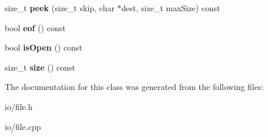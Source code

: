 \begin{DoxyCompactItemize}
\item 
\hypertarget{class_tempest_1_1_r_file_a64ee2bbf742e8a2950925418b25e05dd}{size\+\_\+t {\bfseries peek} (size\+\_\+t skip, char $\ast$dest, size\+\_\+t max\+Size) const }\label{class_tempest_1_1_r_file_a64ee2bbf742e8a2950925418b25e05dd}

\item 
\hypertarget{class_tempest_1_1_r_file_a3f59fa5c90d3ddbf2ebf60a6dcb31141}{bool {\bfseries eof} () const }\label{class_tempest_1_1_r_file_a3f59fa5c90d3ddbf2ebf60a6dcb31141}

\item 
\hypertarget{class_tempest_1_1_r_file_a34271b2bcab68df46d84d58e7bf79c6e}{bool {\bfseries is\+Open} () const }\label{class_tempest_1_1_r_file_a34271b2bcab68df46d84d58e7bf79c6e}

\item 
\hypertarget{class_tempest_1_1_r_file_af4053e073e9565b7da29e8f4dc3530d8}{size\+\_\+t {\bfseries size} () const }\label{class_tempest_1_1_r_file_af4053e073e9565b7da29e8f4dc3530d8}

\end{DoxyCompactItemize}


The documentation for this class was generated from the following files\+:\begin{DoxyCompactItemize}
\item 
io/file.\+h\item 
io/file.\+cpp\end{DoxyCompactItemize}
